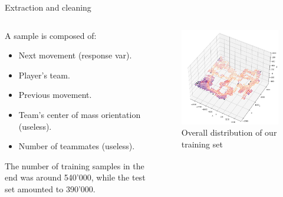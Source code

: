 \documentclass[english]{beamer}
\begin{document}
\begin{frame}{Extraction and cleaning}
  \begin{columns}
    \begin{column}{0.55\textwidth}
      A sample is composed of:
      \begin{itemize}
        \item Next movement (response var).
        \item Player's team.
        \item Previous movement.
        \item Team's center of mass orientation (useless).
        \item Number of teammates (useless).
      \end{itemize}
     The number of training samples in the end was around 540'000, while the test set amounted to 390'000.
    \end{column}
    \begin{column}{0.45\textwidth}
      \begin{figure}
        \centering
        \includegraphics[width=1\textwidth]{images/samples_count.png}
        \caption{Overall distribution of our training set}
      \end{figure}
    \end{column}
  \end{columns}
\end{frame}
\end{document}
